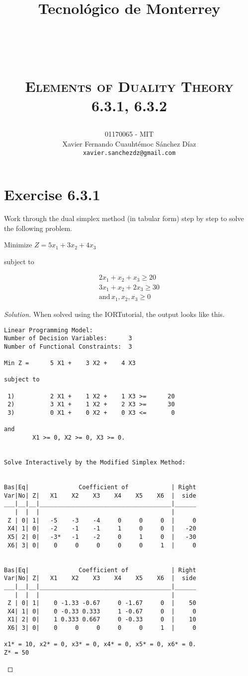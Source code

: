 \documentclass[titlepage, letterpaper, fleqn]{article}
\title{
\vspace{1in}
\textbf{Tecnológico de Monterrey} \\
\vspace{0.5in}
\textmd{\mahclass} \\
\large{\textit{\mahteacher}} \\
\vspace{0.5in}
\textsc{\mahtitle}\\
\textsc{Elements of Duality Theory}\\
\textsc{6.3.1, 6.3.2}\\
\author{01170065  - MIT \\
Xavier Fernando Cuauhtémoc Sánchez Díaz \\
\texttt{xavier.sanchezdz@gmail.com}}
\date{\mahdate}
}
\renewcommand\qedsymbol{\(\blacksquare\)}
\newenvironment{solution}
{\renewcommand\qedsymbol{$\square$}\begin{proof}[Solution]}
{\end{proof}}
\begin{document}
\begin{titlepage}
\maketitle
\end{titlepage}

%
%

\section{Exercise 6.3.1}

{\large Work through the dual simplex method (in tabular form) step by step to solve the following problem.

Minimize $Z = 5x_1 + 3x_2 + 4x_3$

subject to

\begin{align*}
    2x_1 + x_2 + x_3 \geq 20 \\
    3x_1 + x_2 + 2x_3 \geq 30 \\
    \text{and} \, x_1, x_2, x_3 \geq 0
\end{align*}}

\begin{solution}
When solved using the IORTutorial, the output looks like this.
\begin{lstlisting}[basicstyle=\tiny]
Linear Programming Model:
Number of Decision Variables:      3
Number of Functional Constraints:  3

Min Z =      5 X1 +    3 X2 +    4 X3 

subject to

 1)          2 X1 +    1 X2 +    1 X3 >=      20
 2)          3 X1 +    1 X2 +    2 X3 >=      30
 3)          0 X1 +    0 X2 +    0 X3 <=       0

and
        X1 >= 0, X2 >= 0, X3 >= 0.


Solve Interactively by the Modified Simplex Method:


Bas|Eq|              Coefficient of            | Right
Var|No| Z|   X1    X2    X3    X4    X5    X6  |  side
___|__|__|_____________________________________|______
   |  |  |                                     | 
 Z | 0| 1|   -5    -3    -4     0     0     0  |     0
 X4| 1| 0|   -2    -1    -1     1     0     0  |   -20
 X5| 2| 0|   -3*   -1    -2     0     1     0  |   -30
 X6| 3| 0|    0     0     0     0     0     1  |     0


Bas|Eq|              Coefficient of            | Right
Var|No| Z|   X1    X2    X3    X4    X5    X6  |  side
___|__|__|_____________________________________|______
   |  |  |                                     | 
 Z | 0| 1|    0 -1.33 -0.67     0 -1.67     0  |    50
 X4| 1| 0|    0 -0.33 0.333     1 -0.67     0  |     0
 X1| 2| 0|    1 0.333 0.667     0 -0.33     0  |    10
 X6| 3| 0|    0     0     0     0     0     1  |     0

x1* = 10, x2* = 0, x3* = 0, x4* = 0, x5* = 0, x6* = 0.
Z* = 50

\end{lstlisting}
\end{solution}
\end{document}
